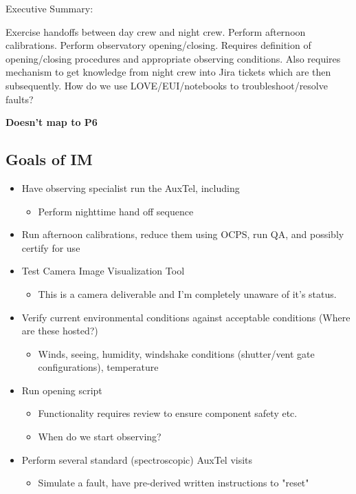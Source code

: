 
Executive Summary:

Exercise handoffs between day crew and night crew. Perform afternoon calibrations.
Perform observatory opening/closing. 
Requires definition of opening/closing procedures and appropriate observing conditions.
Also requires mechanism to get knowledge from night crew into Jira tickets which are then subsequently.
How do we use LOVE/EUI/notebooks to troubleshoot/resolve faults?

\textbf{Doesn't map to P6}

\subsection{Goals of IM}
\begin{itemize}
\item Have observing specialist run the AuxTel, including
  \begin{itemize}
  \item Perform nighttime hand off sequence
  \end{itemize}
\item Run afternoon calibrations, reduce them using \gls{OCPS}, run QA, and possibly certify for use
\item Test Camera Image Visualization Tool
  \begin{itemize}
  \item This is a camera deliverable and I'm completely unaware of it's status.
  \end{itemize}
\item Verify current environmental conditions against acceptable conditions (Where are these hosted?)
  \begin{itemize}
  \item Winds, seeing, humidity, windshake conditions (shutter/vent gate configurations), temperature
  \end{itemize}
\item Run opening script
  \begin{itemize}
  \item Functionality requires review to ensure component safety etc.
  \item When do we start observing?
  \end{itemize}
\item Perform several standard (spectroscopic) AuxTel visits
  \begin{itemize}
  \item Simulate a fault, have pre-derived written instructions to "reset" 

\end{itemize}
\end{itemize}

